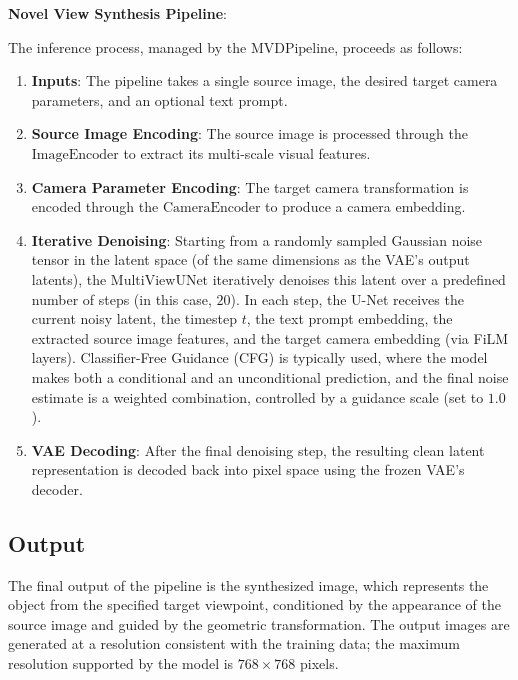 \textbf{Novel View Synthesis Pipeline}:

The inference process, managed by the $\text{MVDPipeline}$, proceeds as follows:
\begin{enumerate}
  \item \textbf{Inputs}: The pipeline takes a single source image, the desired target camera parameters, and an optional text prompt.
  \item \textbf{Source Image Encoding}: The source image is processed through the $\text{ImageEncoder}$ to extract its multi-scale visual features.
  \item \textbf{Camera Parameter Encoding}: The target camera transformation is encoded through the $\text{CameraEncoder}$ to produce a camera embedding.
  \item \textbf{Iterative Denoising}: Starting from a randomly sampled Gaussian noise tensor in the latent space (of the same dimensions as the VAE's output latents), the $\text{MultiViewUNet}$ iteratively denoises this latent over a predefined number of steps (in this case, $20$). In each step, the U-Net receives the current noisy latent, the timestep $t$, the text prompt embedding, the extracted source image features, and the target camera embedding (via FiLM layers). Classifier-Free Guidance (CFG) is typically used, where the model makes both a conditional and an unconditional prediction, and the final noise estimate is a weighted combination, controlled by a guidance scale (set to $1.0$).
  \item \textbf{VAE Decoding}: After the final denoising step, the resulting clean latent representation is decoded back into pixel space using the frozen VAE's decoder.
\end{enumerate}

\subsection{Output}
The final output of the pipeline is the synthesized image, which represents the object from the specified target viewpoint, conditioned by the appearance of the source image and guided by the geometric transformation. The output images are generated at a resolution consistent with the training data; the maximum resolution supported by the model is $768 \times 768$ pixels.
